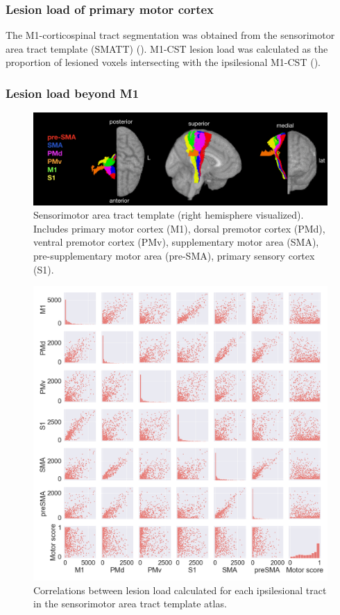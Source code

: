 \documentclass[10pt]{article}
\begin{document}
\subsubsection{Lesion load of primary motor cortex}
The M1-corticospinal tract segmentation was obtained from the sensorimotor area tract template (SMATT) (\cite{Archer2018-ti}). M1-CST lesion load was calculated as the proportion of lesioned voxels intersecting with the ipsilesional M1-CST (\cite{Zhu2010-qh}).


\subsubsection{Lesion load beyond M1}
\begin{figure}[htp]
\centering
\includegraphics[width=1.0\linewidth]{figures/smatt_template.png}
\caption{Sensorimotor area tract template (right hemisphere visualized). Includes primary motor cortex (M1), dorsal premotor cortex (PMd), ventral premotor cortex (PMv), supplementary motor area (SMA), pre-supplementary motor area (pre-SMA), primary sensory cortex (S1).
}
\label{smatt_template}
\end{figure} 
\begin{figure}[]
\centering
\includegraphics[width=0.8\linewidth]{figures/SMATT_scatterplts.png}
\caption{Correlations between lesion load calculated for each ipsilesional tract in the sensorimotor area tract template atlas.}
\label{smatt_pairwise_correlations}
\end{figure}
\end{document}
